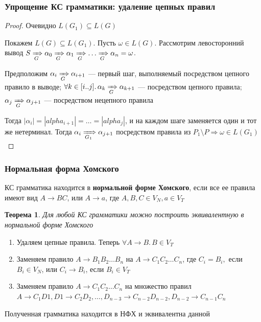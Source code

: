\documentclass{beamer}
\newtheorem{rutheorem}{Теорема}
\newcommand{\derivegone}[1]{\xRightarrow[#1]{}}
\begin{document}
\begin{frame}[fragile]
  \transwipe[direction=90]
  \frametitle{Упрощение КС грамматики: удаление цепных правил}    
  \begin{proof}   
   Очевидно $L(G_1) \subseteq L(G)$
   
   Покажем $L(G) \subseteq L(G_1)$. Пусть $\omega \in L(G)$. Рассмотрим левосторонний вывод $S \derivegone{G} \alpha_0 \derivegone{G} \alpha_1 \derivegone{G} \dots \derivegone{G} \alpha_n = \omega$.
   
   Предположим $\alpha_i \derivegone{G} \alpha_{i+1}$ --- первый шаг, выполняемый посредством цепного правило в выводе; $\forall k \in [i..j]. \, \alpha_k \derivegone{G} \alpha_{k+1}$ --- посредством цепного правила;  $\alpha_j \derivegone{G} \alpha_{j+1}$  --- посредством нецепного правила
   
   Тогда $|\alpha_i| = |alpha_{i+1}| = \dots = |alpha_j|$, и на каждом шаге заменяется один и тот же нетерминал. Тогда $\alpha_i \derivegone{G_1} \alpha_{j+1} $ посредством правила из $P_1 \setminus P \Rightarrow \omega \in L(G_1)$
   \end{proof}
   
\end{frame}

 
\begin{frame}[fragile]
  \transwipe[direction=90]
  \frametitle{Нормальная форма Хомского}    
  КС грамматика находится в \textbf{нормальной форме Хомского}, если все ее правила имеют вид $A \rightarrow B C$, или $A \rightarrow a$, где $A,B,C \in V_N, a \in V_T$
  
  \begin{rutheorem}   
    Для любой КС грамматики можно построить эквивалентную в нормальной форме Хомского
  \end{rutheorem}

     \begin{enumerate}
    \item Удаляем цепные правила. Теперь $\forall A \rightarrow B. \, B \in V_T$
    \item Заменяем правило $A \rightarrow B_1 B_2 \dots B_n$ на $A \rightarrow C_1 C_2 \dots C_n$, где $C_i = B_i,$ если $B_i \in V_N$, или $C_i \rightarrow B_i$, если $B_i \in V_T$
    \item Заменяем правило $A \rightarrow C_1 C_2 \dots C_n$ на множество правил $A \rightarrow C_1 D1, D1 \rightarrow C_2 D_2, \dots, D_{n-3} \rightarrow C_{n-2} D_{n-2}, D_{n-2} \rightarrow C_{n-1} C_n$
  \end{enumerate}
  
        Полученная грамматика находится в НФХ и эквивалентна данной 
\end{frame}
\end{document}
